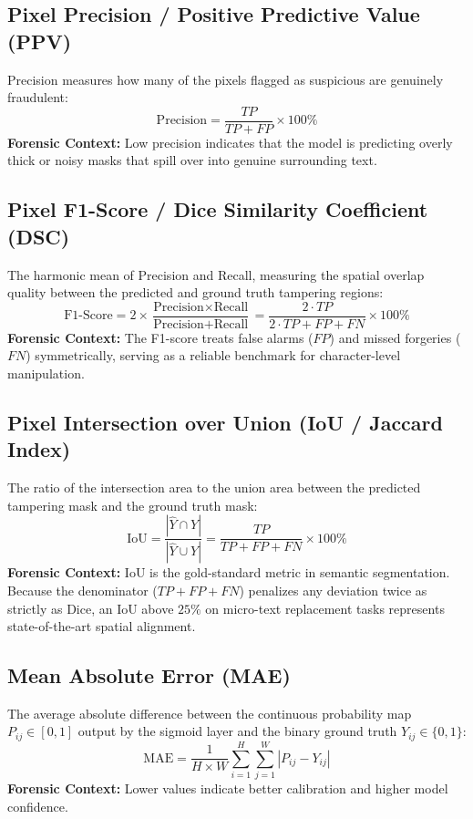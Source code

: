 \documentclass[11pt,a4paper]{article}
\begin{document}
\subsection{Pixel Precision / Positive Predictive Value (PPV)}
Precision measures how many of the pixels flagged as suspicious are genuinely fraudulent:
\begin{equation}
\text{Precision} = \frac{TP}{TP + FP} \times 100\%
\end{equation}
\textbf{Forensic Context:} Low precision indicates that the model is predicting overly thick or noisy masks that spill over into genuine surrounding text.

\subsection{Pixel F1-Score / Dice Similarity Coefficient (DSC)}
The harmonic mean of Precision and Recall, measuring the spatial overlap quality between the predicted and ground truth tampering regions:
\begin{equation}
\text{F1-Score} = 2 \times \frac{\text{Precision} \times \text{Recall}}{\text{Precision} + \text{Recall}} = \frac{2 \cdot TP}{2 \cdot TP + FP + FN} \times 100\%
\end{equation}
\textbf{Forensic Context:} The F1-score treats false alarms ($FP$) and missed forgeries ($FN$) symmetrically, serving as a reliable benchmark for character-level manipulation.

\subsection{Pixel Intersection over Union (IoU / Jaccard Index)}
The ratio of the intersection area to the union area between the predicted tampering mask and the ground truth mask:
\begin{equation}
\text{IoU} = \frac{| \hat{Y} \cap Y |}{| \hat{Y} \cup Y |} = \frac{TP}{TP + FP + FN} \times 100\%
\end{equation}
\textbf{Forensic Context:} IoU is the gold-standard metric in semantic segmentation. Because the denominator ($TP + FP + FN$) penalizes any deviation twice as strictly as Dice, an IoU above $25\%$ on micro-text replacement tasks represents state-of-the-art spatial alignment.

\subsection{Mean Absolute Error (MAE)}
The average absolute difference between the continuous probability map $P_{ij} \in [0, 1]$ output by the sigmoid layer and the binary ground truth $Y_{ij} \in \{0, 1\}$:
\begin{equation}
\text{MAE} = \frac{1}{H \times W} \sum_{i=1}^{H} \sum_{j=1}^{W} \left| P_{ij} - Y_{ij} \right|
\end{equation}
\textbf{Forensic Context:} Lower values indicate better calibration and higher model confidence.
\end{document}
